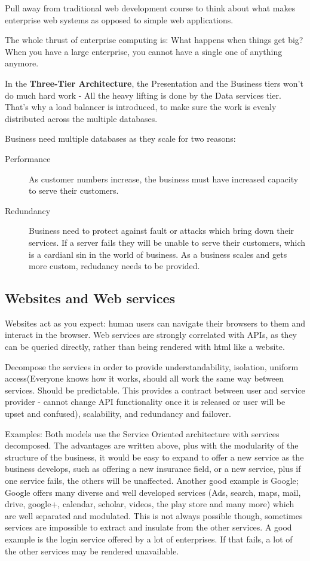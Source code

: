 \documentclass[11pt]{article}
\begin{document}
Pull away from traditional web development course to think about what makes enterprise web systems as opposed to simple web applications.

The whole thrust of enterprise computing is: What happens when things get big? When you have a large enterprise, you cannot have a single one of anything anymore.

In the \textbf{Three-Tier Architecture}, the Presentation and the Business tiers won’t do much hard work - All the heavy lifting is done by the Data services tier. That’s why a load balancer is introduced, to make sure the work is evenly distributed across the multiple databases.

Business need multiple databases as they scale for two reasons:
\begin{description}
\item[Performance] As customer numbers increase, the business must have increased capacity to serve their customers.
\item[Redundancy] Business need to protect against fault or attacks which bring down their services. If a server fails they will be unable to serve their customers, which is a cardianl sin in the world of business. As a business scales and gets more custom, redudancy needs to be provided.
\end{description}

\subsection{Websites and Web services}

Websites act as you expect: human users can navigate their browsers to them and interact in the browser. Web services are strongly correlated with APIs, as they can be queried directly, rather than being rendered with html like a website. 

Decompose the services in order to provide understandability, isolation, uniform access(Everyone knows how it works, should all work the same way between services. Should be predictable. This provides a contract between user and service provider - cannot change API functionality once it is released or user will be upset and confused), scalability, and redundancy and failover.

Examples: Both models use the Service Oriented architecture with services decomposed. The advantages are written above, plus with the modularity of the structure of the business, it would be easy to expand to offer a new service as the business develops, such as offering a new insurance field, or a new service, plus if one service fails, the others will be unaffected. Another good example is Google; Google offers many diverse and well developed services (Ads, search, maps, mail, drive, google+, calendar, scholar, videos, the play store and many more) which are well separated and modulated. This is not always possible though, sometimes services are impossible to extract and insulate from the other services. A good example is the login service offered by a lot of enterprises. If that fails, a lot of the other services may be rendered unavailable.
\end{document}
